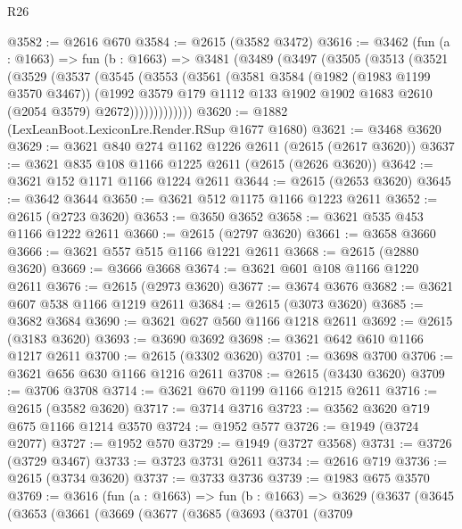 \begin{lexlean}{R26}
\begin{coremodule}
@3582 := @2616 @670
@3584 := @2615 (@3582 @3472)
@3616 := @3462
    (fun (a : @1663) =>
    fun (b : @1663) =>
    @3481
      (@3489
        (@3497
          (@3505
            (@3513
              (@3521
                (@3529
                  (@3537
                    (@3545
                      (@3553
                        (@3561
                          (@3581
                            @3584
                            (@1982 (@1983 @1199 @3570 @3467))
                            (@1992
                              @3579
                              @179
                              @1112
                              @133
                              @1902
                              @1902
                              @1683
                              @2610
                              (@2054 @3579)
                              @2672)))))))))))))
@3620 := @1882 (LexLeanBoot.LexiconLre.Render.RSup @1677 @1680)
@3621 := @3468 @3620
@3629 := @3621 @840 @274 @1162 @1226 @2611 (@2615 (@2617 @3620))
@3637 := @3621 @835 @108 @1166 @1225 @2611 (@2615 (@2626 @3620))
@3642 := @3621 @152 @1171 @1166 @1224 @2611
@3644 := @2615 (@2653 @3620)
@3645 := @3642 @3644
@3650 := @3621 @512 @1175 @1166 @1223 @2611
@3652 := @2615 (@2723 @3620)
@3653 := @3650 @3652
@3658 := @3621 @535 @453 @1166 @1222 @2611
@3660 := @2615 (@2797 @3620)
@3661 := @3658 @3660
@3666 := @3621 @557 @515 @1166 @1221 @2611
@3668 := @2615 (@2880 @3620)
@3669 := @3666 @3668
@3674 := @3621 @601 @108 @1166 @1220 @2611
@3676 := @2615 (@2973 @3620)
@3677 := @3674 @3676
@3682 := @3621 @607 @538 @1166 @1219 @2611
@3684 := @2615 (@3073 @3620)
@3685 := @3682 @3684
@3690 := @3621 @627 @560 @1166 @1218 @2611
@3692 := @2615 (@3183 @3620)
@3693 := @3690 @3692
@3698 := @3621 @642 @610 @1166 @1217 @2611
@3700 := @2615 (@3302 @3620)
@3701 := @3698 @3700
@3706 := @3621 @656 @630 @1166 @1216 @2611
@3708 := @2615 (@3430 @3620)
@3709 := @3706 @3708
@3714 := @3621 @670 @1199 @1166 @1215 @2611
@3716 := @2615 (@3582 @3620)
@3717 := @3714 @3716
@3723 := @3562 @3620 @719 @675 @1166 @1214 @3570
@3724 := @1952 @577
@3726 := @1949 (@3724 @2077)
@3727 := @1952 @570
@3729 := @1949 (@3727 @3568)
@3731 := @3726 (@3729 @3467)
@3733 := @3723 @3731 @2611
@3734 := @2616 @719
@3736 := @2615 (@3734 @3620)
@3737 := @3733 @3736
@3739 := @1983 @675 @3570
@3769 := @3616
    (fun (a : @1663) =>
    fun (b : @1663) =>
    @3629
      (@3637
        (@3645
          (@3653
            (@3661
              (@3669
                (@3677
                  (@3685
                    (@3693
                      (@3701
                        (@3709

\end{coremodule}
\end{lexlean}
